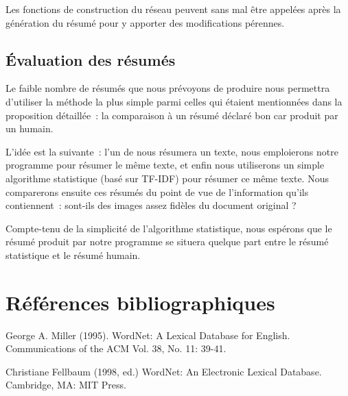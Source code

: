 \documentclass[a4paper,12pt]{article}
\begin{document}
Les fonctions de construction du réseau peuvent sans mal être appelées après la génération du résumé pour y apporter des modifications pérennes.

\subsection{\'Evaluation des résumés}
Le faible nombre de résumés que nous prévoyons de produire nous permettra d'utiliser la méthode la plus simple parmi celles qui étaient mentionnées dans la proposition détaillée~: la comparaison à un résumé déclaré bon car produit par un humain.

L'idée est la suivante~: l'un de nous résumera un texte, nous emploierons notre programme pour résumer le même texte, et enfin nous utiliserons un simple algorithme statistique (basé sur TF-IDF) pour résumer ce même texte. Nous comparerons ensuite ces résumés du point de vue de l'information qu'ils contiennent~: sont-ils des images assez fidèles du document original ?

Compte-tenu de la simplicité de l'algorithme statistique, nous espérons que le résumé produit par notre programme se situera quelque part entre le résumé statistique et le résumé humain.

\section{R\'ef\'erences bibliographiques}

\nocite{*}
\printbibliography{}

George A. Miller (1995). WordNet: A Lexical Database for English.
Communications of the ACM Vol. 38, No. 11: 39-41.

Christiane Fellbaum (1998, ed.) WordNet: An Electronic Lexical Database. Cambridge, MA: MIT Press.

\appendix

\printindex
\end{document}
